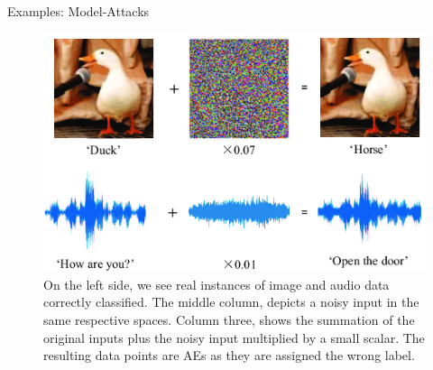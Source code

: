 \documentclass[11pt,compress,t,notes=noshow, xcolor=table]{beamer}
\begin{document}
\begin{vbframe}{Examples: Model-Attacks}
\begin{figure}[h]
\centering
  \includegraphics[width=0.6\linewidth]{figure/AEduckSound.png}
  \caption{On the left side, we see real instances of image and audio data  correctly classified. The middle column, depicts a noisy input in the same respective spaces. Column three, shows the summation of the original inputs plus the noisy input multiplied by a small scalar. The resulting data points are AEs as they are assigned the wrong label.}
  \label{fig:mnist}
\end{figure} 


\end{vbframe}
\end{document}
